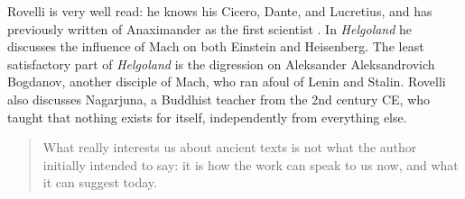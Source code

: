 \documentclass[]{article}
\begin{document}
Rovelli is very well read: he knows his Cicero, Dante, and Lucretius, and has previously written of Anaximander as the first scientist \cite{rovelli2011anaximander}. In \emph{Helgoland} he discusses the influence of Mach on both Einstein and Heisenberg. The least satisfactory part of \emph{Helgoland} is the digression on Aleksander Aleksandrovich Bogdanov, another disciple of Mach, who ran afoul of Lenin and Stalin. Rovelli also discusses Nagarjuna, a Buddhist teacher from the 2nd century CE, who taught that nothing exists for itself, independently from everything else. \begin{quotation}
	What really interests us about ancient texts is not what the author initially intended to say: it is how the work can speak to us now, and what it can suggest today.
\end{quotation}  



\end{document}
